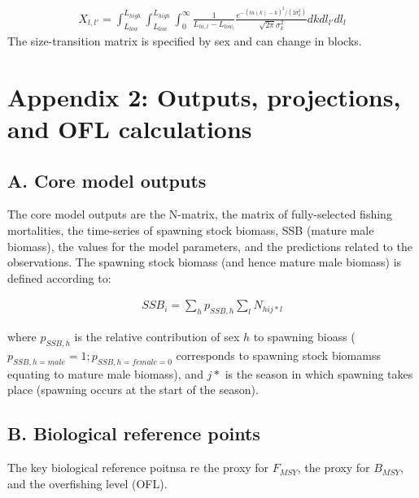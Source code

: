 \documentclass[]{article}
\begin{document}
\begin{align}
  X_{l,l'} = \int_{L_{low}}^{L_{high}} \! \int_{L_{low}}^{L_{high}} \! \int_{0}^{\infty} 
            \frac{1}{L_{hi,l}-L_{low_{l}}}
            \frac{e^{-(ln(k)-\bar{k})^{2}/(2\sigma^{2}_{k})}}
                                          {\sqrt{2\pi}\sigma^{2}_{k}} dk dl_{l'} dl_{l}
                                          
 \end{align} The size-transition matrix is specified by sex and can
change in blocks.

\hypertarget{appendix-2-outputs-projections-and-ofl-calculations}{%
\section{Appendix 2: Outputs, projections, and OFL
calculations}\label{appendix-2-outputs-projections-and-ofl-calculations}}

\hypertarget{a.-core-model-outputs}{%
\subsection{A. Core model outputs}\label{a.-core-model-outputs}}

The core model outputs are the N-matrix, the matrix of fully-selected
fishing mortalities, the time-series of spawning stock biomass, SSB
(mature male biomass), the values for the model parameters, and the
predictions related to the observations. The spawning stock biomass (and
hence mature male biomass) is defined according to:

\begin{align}
 SSB_{i} = \sum_{h}p_{SSB,h} \sum_{l}N_{hij*l}
 \end{align}

where \(p_{SSB,h}\) is the relative contribution of sex \(h\) to
spawning bioass (\(p_{SSB,h=male}=1; p_{SSB,h=female = 0}\) corresponds
to spawning stock biomamss equating to mature male biomass), and \(j*\)
is the season in which spawning takes place (spawning occurs at the
start of the season).

\hypertarget{b.-biological-reference-points}{%
\subsection{B. Biological reference
points}\label{b.-biological-reference-points}}

The key biological reference poitnsa re the proxy for \(F_{MSY}\), the
proxy for \(B_{MSY}\), and the overfishing level (OFL).
\end{document}
